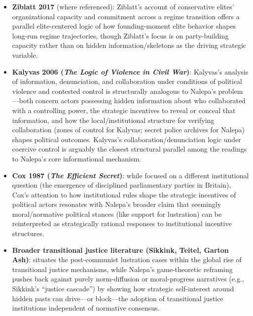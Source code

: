 \documentclass[12pt]{article}
\begin{document}
\begin{itemize}[leftmargin=*, itemsep=4pt]
    \item \textbf{Ziblatt 2017} (where referenced): Ziblatt's account of conservative elites' organizational capacity and commitment across a regime transition offers a parallel elite-centered logic of how founding-moment elite behavior shapes long-run regime trajectories, though Ziblatt's focus is on party-building capacity rather than on hidden information/skeletons as the driving strategic variable.
    \item \textbf{Kalyvas 2006 (\textit{The Logic of Violence in Civil War})}: Kalyvas's analysis of information, denunciation, and collaboration under conditions of political violence and contested control is structurally analogous to Nalepa's problem---both concern actors possessing hidden information about who collaborated with a controlling power, the strategic incentives to reveal or conceal that information, and how the local/institutional structure for verifying collaboration (zones of control for Kalyvas; secret police archives for Nalepa) shapes political outcomes. Kalyvas's collaboration/denunciation logic under coercive control is arguably the closest structural parallel among the readings to Nalepa's core informational mechanism.
    \item \textbf{Cox 1987 (\textit{The Efficient Secret})}: while focused on a different institutional question (the emergence of disciplined parliamentary parties in Britain), Cox's attention to how institutional rules shape the strategic incentives of political actors resonates with Nalepa's broader claim that seemingly moral/normative political stances (like support for lustration) can be reinterpreted as strategically rational responses to institutional incentive structures.
    \item \textbf{Broader transitional justice literature (Sikkink, Teitel, Garton Ash)}: situates the post-communist lustration cases within the global rise of transitional justice mechanisms, while Nalepa's game-theoretic reframing pushes back against purely norm-diffusion or moral-progress narratives (e.g., Sikkink's ``justice cascade'') by showing how strategic self-interest around hidden pasts can drive---or block---the adoption of transitional justice institutions independent of normative consensus.
\end{itemize}
\end{document}
